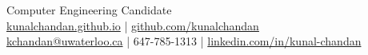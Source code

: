 \documentclass[]{chandan-cv}
\begin{document}
%
%

%
%
{ 
Computer Engineering Candidate \\
\href{http://kunalchandan.github.io}{kunalchandan.github.io} | 
\href{http://github.com/kunalchandan}{github.com/kunalchandan}\\
\href{mailto:kchandan@uwaterloo.ca}{kchandan@uwaterloo.ca} | 
647-785-1313 | 
\href{https://www.linkedin.com/in/kunal-chandan/}{linkedin.com/in/kunal-chandan}
}

%
%
\end{document}
